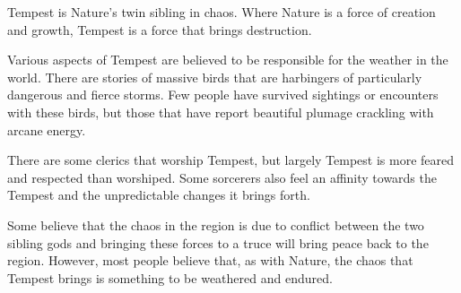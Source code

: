 Tempest is Nature's twin sibling in chaos.
Where Nature is a force of creation and growth, Tempest is a force that brings destruction.

Various aspects of Tempest are believed to be responsible for the weather in the world.
There are stories of massive birds that are harbingers of particularly dangerous and fierce storms.
Few people have survived sightings or encounters with these birds, but those that have report beautiful plumage crackling with arcane energy.

There are some clerics that worship Tempest, but largely Tempest is more feared and respected than worshiped.
Some sorcerers also feel an affinity towards the Tempest and the unpredictable changes it brings forth.

Some believe that the chaos in the region is due to conflict between the two sibling gods and bringing these forces to a truce will bring peace back to the region.
However, most people believe that, as with Nature, the chaos that Tempest brings is something to be weathered and endured.
